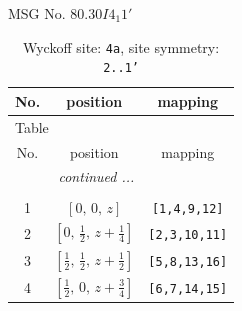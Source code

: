 \documentclass[fleqn,8pt]{jsarticle}
\begin{document}
\setcounter{MaxMatrixCols}{32}

\renewcommand{\tablename}{Table~}
\renewcommand{\figurename}{Figure~}
\begin{center}
\LARGE
MSG No. 80.30\quad$I4_{1}1'$
\end{center}
\renewcommand{\arraystretch}{1.2}
\begin{longtable}{ccc}
\caption{Wyckoff site: {\tt 4a}, site symmetry: {\tt 2..1'}}
 \\
 \hline \hline
No. & position & mapping \\ \hline \endfirsthead

\multicolumn{2}{l}{\tablename\ \thetable{}} \\
 \hline \hline
No. & position & mapping \\ \hline \endhead

 \hline \hline
\multicolumn{2}{r}{\footnotesize\it continued ...} \\ \endfoot

 \hline \hline
\multicolumn{2}{r}{} \\ \endlastfoot

1 & $\left[ 0,\, 0,\, z \right]$ & {\tt [1,4,9,12]} \\ \hline
2 & $\left[ 0,\, \frac{1}{2},\, z + \frac{1}{4} \right]$ & {\tt [2,3,10,11]} \\ \hline
3 & $\left[ \frac{1}{2},\, \frac{1}{2},\, z + \frac{1}{2} \right]$ & {\tt [5,8,13,16]} \\ \hline
4 & $\left[ \frac{1}{2},\, 0,\, z + \frac{3}{4} \right]$ & {\tt [6,7,14,15]} \\
\end{longtable}
\renewcommand{\arraystretch}{1.2}
\end{document}
